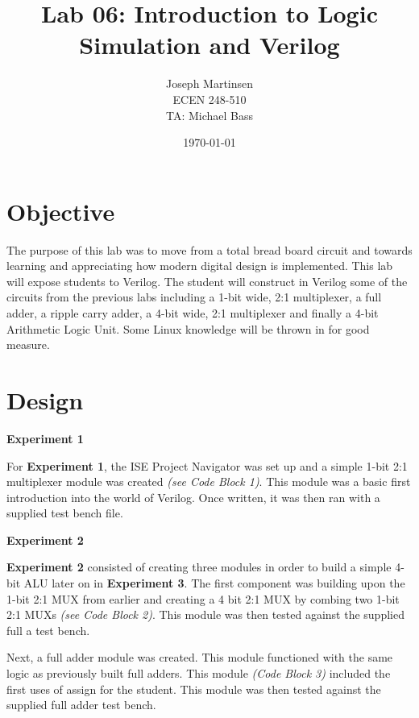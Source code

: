 \documentclass[a4paper,12pt]{article}
\title{\textbf{Lab 06: Introduction to Logic Simulation and Verilog}}
\author{Joseph Martinsen \\ ECEN 248-510 \\ TA: Michael Bass}
\date{\today}
\begin{document}
\section*{Objective}
\hspace{15pt}The purpose of this lab was to move from a total bread board circuit and towards learning and appreciating how modern digital design is implemented. This lab will expose students to Verilog. The student will construct in Verilog some of the circuits from the previous labs including a 1-bit wide, 2:1 multiplexer, a full adder, a ripple carry adder, a 4-bit wide, 2:1 multiplexer and finally a 4-bit Arithmetic Logic Unit. Some Linux knowledge will be thrown in for good measure.

\section*{Design}
\textbf{Experiment 1}
\vspace{5pt}

For \textbf{Experiment 1}, the ISE Project Navigator was set up and a simple 1-bit 2:1 multiplexer module was created \textit{(see Code Block 1)}. This module was a basic first introduction into the world of Verilog. Once written, it was then ran with a supplied test bench file.


\vspace{5pt}

\hspace{-15pt}\textbf{Experiment 2}
\vspace{5pt}

\textbf{Experiment 2} consisted of creating three modules in order to build a simple 4-bit ALU later on in \textbf{Experiment 3}. The first component was building upon the 1-bit 2:1 MUX from earlier and creating a 4 bit 2:1 MUX by combing two  1-bit 2:1 MUXs \textit{(see Code Block 2)}. This module was then tested against the supplied full a test bench.



Next, a full adder module was created. This module functioned with the same logic as previously built full adders. This module \textit{(Code Block 3)} included the first uses of assign for the student. This module was then tested against the supplied full adder test bench.


\end{document}
